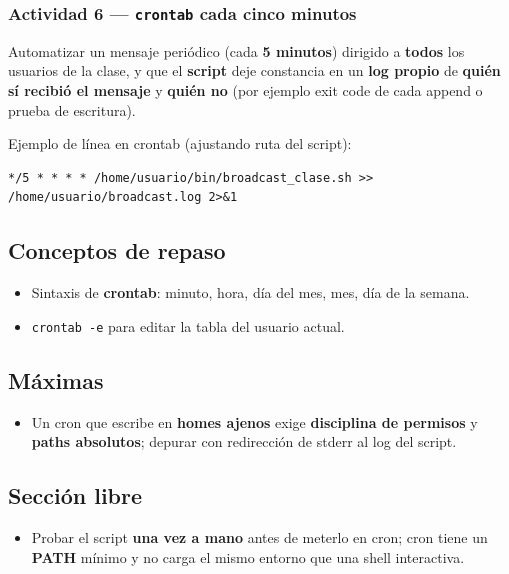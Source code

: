 \documentclass[11pt, letterpaper]{article}
\begin{document}
\subsubsection{Actividad 6 — \texttt{crontab} cada cinco minutos}
\label{sec:org3f3dad8}
Automatizar un mensaje periódico (cada \textbf{5 minutos}) dirigido a \textbf{todos} los usuarios de la clase, y que el \textbf{script} deje constancia en un \textbf{log propio} de \textbf{quién sí recibió el mensaje} y \textbf{quién no} (por ejemplo exit code de cada append o prueba de escritura).

Ejemplo de línea en crontab (ajustando ruta del script):

\begin{verbatim}
*/5 * * * * /home/usuario/bin/broadcast_clase.sh >> /home/usuario/broadcast.log 2>&1
\end{verbatim}
\subsection{Conceptos de repaso}
\label{sec:org068bc5c}

\begin{itemize}
\item Sintaxis de \textbf{crontab}: minuto, hora, día del mes, mes, día de la semana.
\item \texttt{crontab -e} para editar la tabla del usuario actual.
\end{itemize}
\subsection{Máximas}
\label{sec:orge1af4d1}

\begin{itemize}
\item Un cron que escribe en \textbf{homes ajenos} exige \textbf{disciplina de permisos} y \textbf{paths absolutos}; depurar con redirección de stderr al log del script.
\end{itemize}
\subsection{Sección libre}
\label{sec:orga969b36}

\begin{itemize}
\item Probar el script \textbf{una vez a mano} antes de meterlo en cron; cron tiene un \textbf{PATH} mínimo y no carga el mismo entorno que una shell interactiva.
\end{itemize}
\end{document}
